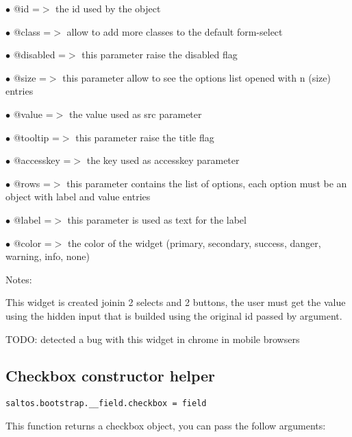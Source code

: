 \documentclass[a4paper]{book}
\begin{document}
\begin{compactitem}
\item[\color{myblue}$\bullet$] @id        =$>$ the id used by the object
\item[\color{myblue}$\bullet$] @class     =$>$ allow to add more classes to the default form-select
\item[\color{myblue}$\bullet$] @disabled  =$>$ this parameter raise the disabled flag
\item[\color{myblue}$\bullet$] @size      =$>$ this parameter allow to see the options list opened with n (size) entries
\item[\color{myblue}$\bullet$] @value     =$>$ the value used as src parameter
\item[\color{myblue}$\bullet$] @tooltip   =$>$ this parameter raise the title flag
\item[\color{myblue}$\bullet$] @accesskey =$>$ the key used as accesskey parameter
\item[\color{myblue}$\bullet$] @rows      =$>$ this parameter contains the list of options, each option must be an object
              with label and value entries
\item[\color{myblue}$\bullet$] @label     =$>$ this parameter is used as text for the label
\item[\color{myblue}$\bullet$] @color     =$>$ the color of the widget (primary, secondary, success, danger, warning, info, none)
\end{compactitem}

Notes:

This widget is created joinin 2 selects and 2 buttons, the user must get the value
using the hidden input that is builded using the original id passed by argument.

TODO: detected a bug with this widget in chrome in mobile browsers

\hypertarget{toc474}{}
\subsection{Checkbox constructor helper}

\begin{lstlisting}
saltos.bootstrap.__field.checkbox = field
\end{lstlisting}

This function returns a checkbox object, you can pass the follow arguments:
\end{document}
